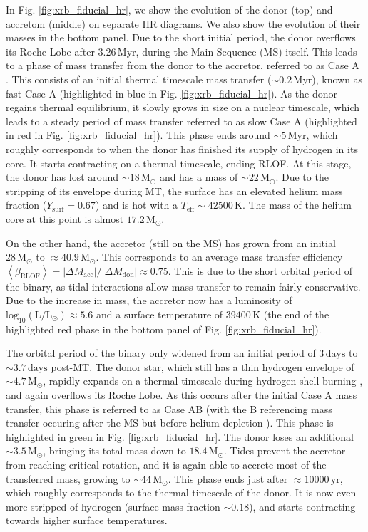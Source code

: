 \documentclass[linenumbers,trackchanges,twocolumn]{aastex701}
\newcommand{\Mdot}{\mathrm{M}_{\odot}}
\newcommand{\Ldot}{\mathrm{L}_{\odot}}
\begin{document}
In Fig. \ref{fig:xrb_fiducial_hr}, we show the evolution of the donor (top) and accretom (middle) on separate HR diagrams. We also show the evolution of their masses in the bottom panel. Due to the short initial period, the donor overflows its Roche Lobe after $3.26\,\mathrm{Myr}$, during the Main Sequence (MS) itself. This leads to a phase of mass transfer from the donor to the accretor, referred to as Case A \citep{1967ZA.....65..251K}. This consists of an initial thermal timescale mass transfer ($\sim 0.2\, \mathrm{Myr}$), known as fast Case A (highlighted in blue in Fig. \ref{fig:xrb_fiducial_hr}). As the donor regains thermal equilibrium, it slowly grows in size on a nuclear timescale, which leads to a steady period of mass transfer referred to as slow Case A (highlighted in red in Fig. \ref{fig:xrb_fiducial_hr}). This phase ends around $\sim 5\,\mathrm{Myr}$, which roughly corresponds to when the donor has finished its supply of hydrogen in its core. It starts contracting on a thermal timescale, ending RLOF. At this stage, the donor has lost around $\sim 18\,\Mdot$ and has a mass of $\sim 22\,\Mdot$. Due to the stripping of its envelope during MT, the surface has an elevated helium mass fraction ($Y_{\mathrm{surf}} = 0.67$) and is hot with a $T_{\mathrm{eff}} \sim 42500\,\mathrm{K}$. The mass of the helium core at this point is almost $17.2\,\Mdot$.

On the other hand, the accretor (still on the MS) has grown from an initial $28\,\Mdot$ to $\approx 40.9\,\Mdot$. This corresponds to an average mass transfer efficiency $\left\langle\beta_{\mathrm{RLOF}}\right\rangle = |\Delta M_{\mathrm{acc}}|/|\Delta M_{\mathrm{don}}| \approx 0.75$. This is due to the short orbital period of the binary, as tidal interactions allow mass transfer to remain fairly conservative. Due to the increase in mass, the accretor now has a luminosity of $\mathrm{log_{10}}(\mathrm{L}/\Ldot) \approx 5.6$ and a surface temperature of $39400\,\mathrm{K}$ (the end of the highlighted red phase in the bottom panel of Fig. \ref{fig:xrb_fiducial_hr}).

The orbital period of the binary only widened from an initial period of $3\,\mathrm{days}$ to $\sim 3.7\,\mathrm{days}$ post-MT. The donor star, which still has a thin hydrogen envelope of $\sim 4.7\,\Mdot$, rapidly expands on a thermal timescale during hydrogen shell burning \citep[e.g.,][]{2017A&A...608A..11G, 2020A&A...637A...6L}, and again overflows its Roche Lobe. As this occurs after the initial Case A mass transfer, this phase is referred to as Case AB (with the B referencing mass transfer occuring after the MS but before helium depletion \citealp{1967ZA.....65..251K}). This phase is highlighted in green in Fig. \ref{fig:xrb_fiducial_hr}. The donor loses an additional $\sim 3.5\,\Mdot$, bringing its total mass down to $18.4\,\Mdot$. Tides prevent the accretor from reaching critical rotation, and it is again able to accrete most of the transferred mass, growing to $\sim 44\,\Mdot$. This phase ends just after $\approx 10000\, \mathrm{yr}$, which roughly corresponds to the thermal timescale of the donor. It is now even more stripped of hydrogen (surface mass fraction $\sim 0.18$), and starts contracting towards higher surface temperatures.
\end{document}
